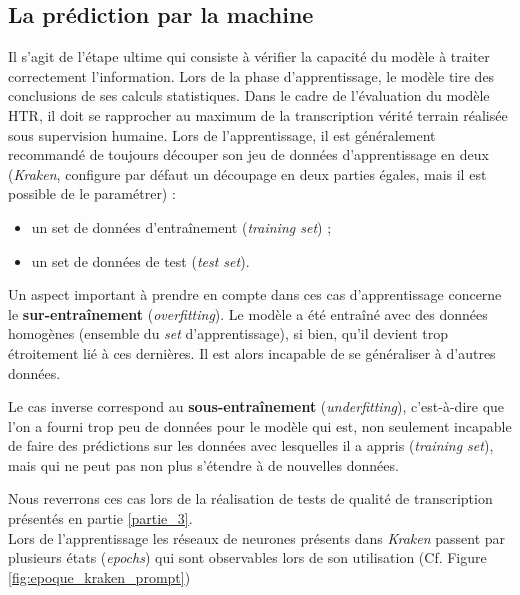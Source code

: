 \subsection{La prédiction par la machine}

Il s'agit de l'étape ultime qui consiste à vérifier la capacité du modèle à traiter correctement l'information. Lors de la phase d'apprentissage, le modèle tire des conclusions de ses calculs statistiques. Dans le cadre de l'évaluation du modèle HTR, il doit se rapprocher au maximum de la transcription vérité terrain réalisée sous supervision humaine. Lors de l'apprentissage, il est généralement recommandé de toujours découper son jeu de données d'apprentissage en deux (\textit{Kraken}, configure par défaut un découpage en deux parties égales, mais il est possible de le paramétrer) :

\begin{itemize}
    \item un set de données d'entraînement (\textit{training set}) ;
    \item un set de données de test (\textit{test set}).\\ 
\end{itemize}

Un aspect important à prendre en compte dans ces cas d'apprentissage concerne le \textbf{sur-entraînement} (\textit{overfitting}). Le modèle a été entraîné avec des données homogènes (ensemble du \textit{set} d'apprentissage), si bien, qu'il devient trop étroitement lié à ces dernières. Il est alors incapable de se généraliser à d'autres données. 

Le cas inverse correspond au \textbf{sous-entraînement} (\textit{underfitting}), c'est-à-dire que l'on a fourni trop peu de données pour le modèle qui est, non seulement incapable de faire des prédictions sur les données avec lesquelles il a appris (\textit{training set}), mais qui ne peut pas non plus s'étendre à de nouvelles données. 

Nous reverrons ces cas lors de la réalisation de tests de qualité de transcription présentés en partie \ref{partie_3}.\\ 

Lors de l'apprentissage les réseaux de neurones présents dans \textit{Kraken} passent par plusieurs états (\textit{epochs}) qui sont observables lors de son utilisation (Cf. Figure \ref{fig:epoque_kraken_prompt}) \\


